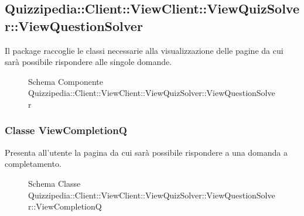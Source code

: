 \subsection{Quizzipedia::Client::ViewClient::ViewQuizSolver::ViewQuestionSolver}
Il package raccoglie le classi necessarie alla visualizzazione delle pagine da cui sarà possibile rispondere alle singole domande.
\begin{figure}[H]
\centering
\noindent{}
\caption[Schema Componente Quizzipedia::Client::ViewClient::ViewQuizSolver::ViewQuestionSolver]{Schema Componente Quizzipedia::Client::ViewClient::ViewQuizSolver::ViewQuestionSolver}
\end{figure}
\subsubsection{Classe ViewCompletionQ}
Presenta all'utente la pagina da cui sarà possibile rispondere a una domanda a completamento.
\begin{figure}[H]
\centering
\noindent{}
\caption[Schema Classe ViewCompletionQ]{Schema Classe Quizzipedia::Client::ViewClient::ViewQuizSolver::ViewQuestionSolver::ViewCompletionQ}
\end{figure}
